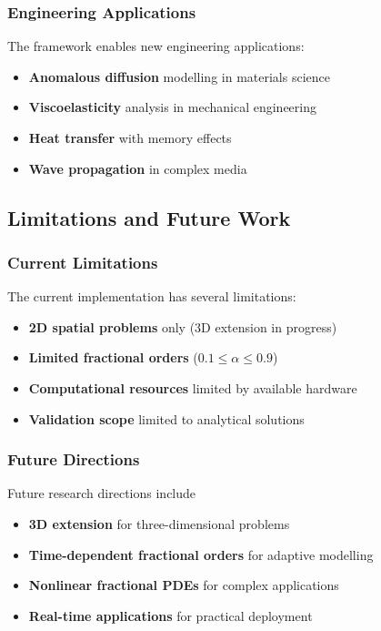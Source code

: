 \documentclass[12pt,a4paper]{article}
\theoremstyle{definition}
\begin{document}
\subsubsection{Engineering Applications}

The framework enables new engineering applications:

\begin{itemize}
    \item \textbf{Anomalous diffusion} modelling in materials science
    \item \textbf{Viscoelasticity} analysis in mechanical engineering
    \item \textbf{Heat transfer} with memory effects
    \item \textbf{Wave propagation} in complex media
\end{itemize}

\subsection{Limitations and Future Work}

\subsubsection{Current Limitations}

The current implementation has several limitations:

\begin{itemize}
    \item \textbf{2D spatial problems} only (3D extension in progress)
    \item \textbf{Limited fractional orders} ($0.1 \leq \alpha \leq 0.9$)
    \item \textbf{Computational resources} limited by available hardware
    \item \textbf{Validation scope} limited to analytical solutions
\end{itemize}

\subsubsection{Future Directions}

Future research directions include

\begin{itemize}
    \item \textbf{3D extension} for three-dimensional problems
    \item \textbf{Time-dependent fractional orders} for adaptive modelling
    \item \textbf{Nonlinear fractional PDEs} for complex applications
    \item \textbf{Real-time applications} for practical deployment
\end{itemize}
\end{document}
